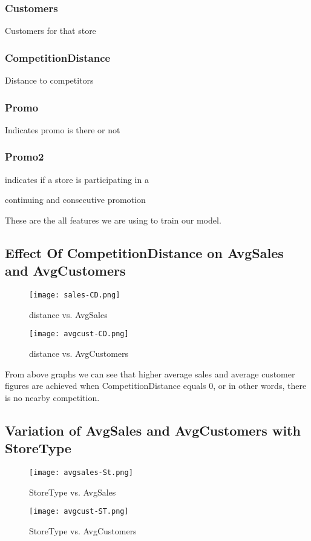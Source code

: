 \documentclass[letterpaper, 10 pt, conference]{ieeeconf}  %
\begin{document}
\subsubsection{\textbf{Customers}} Customers for that store
\subsubsection{\textbf{CompetitionDistance}} Distance to competitors
\subsubsection{\textbf{Promo}} Indicates promo is there or not
\subsubsection{\textbf{Promo2}} indicates if a store is participating in a 

continuing and consecutive promotion

These are the all features we are using to train our model.
\subsection{Effect Of CompetitionDistance on AvgSales and AvgCustomers}

\begin{figure}[h!]
    \centering
    \texttt{[image: sales-CD.png]}
    \caption{distance vs. AvgSales}
\end{figure}

\bigskip


\begin{figure}
    \centering
    \texttt{[image: avgcust-CD.png]}
    \caption{distance vs. AvgCustomers}
\end{figure}

From above graphs we can see that higher average sales  and average customer figures are achieved when
CompetitionDistance equals 0, or in other words, there is no nearby competition.

\subsection{Variation of AvgSales and AvgCustomers with StoreType}

\begin{figure}[h!]
    \centering
    \texttt{[image: avgsales-St.png]}
    \caption{StoreType vs. AvgSales}
\bigskip
\bigskip
    \centering
    \texttt{[image: avgcust-ST.png]}
    \caption{StoreType vs. AvgCustomers}
\end{figure}
\end{document}
